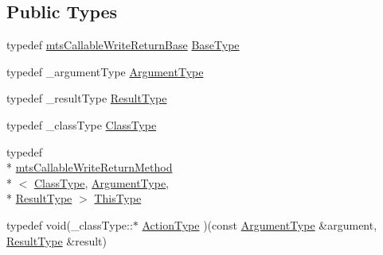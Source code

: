 \subsection*{Public Types}
\begin{DoxyCompactItemize}
\item 
typedef \hyperlink{classmts_callable_write_return_base}{mts\-Callable\-Write\-Return\-Base} \hyperlink{classmts_callable_write_return_method_a324edde317d1c130c8f88c2f3ff71ed2}{Base\-Type}
\item 
typedef \-\_\-argument\-Type \hyperlink{classmts_callable_write_return_method_a694e2620eacec8300718daa334cccd01}{Argument\-Type}
\item 
typedef \-\_\-result\-Type \hyperlink{classmts_callable_write_return_method_aad7815169b189d2f7a0e240ea134fd97}{Result\-Type}
\item 
typedef \-\_\-class\-Type \hyperlink{classmts_callable_write_return_method_a51dbe6298941ab172d83182c8188092d}{Class\-Type}
\item 
typedef \\*
\hyperlink{classmts_callable_write_return_method}{mts\-Callable\-Write\-Return\-Method}\\*
$<$ \hyperlink{classmts_callable_write_return_method_a51dbe6298941ab172d83182c8188092d}{Class\-Type}, \hyperlink{classmts_callable_write_return_method_a694e2620eacec8300718daa334cccd01}{Argument\-Type}, \\*
\hyperlink{classmts_callable_write_return_method_aad7815169b189d2f7a0e240ea134fd97}{Result\-Type} $>$ \hyperlink{classmts_callable_write_return_method_adc8a7a7a10c5aa9fe1e63b4e667c5d6c}{This\-Type}
\item 
typedef void(\-\_\-class\-Type\-::$\ast$ \hyperlink{classmts_callable_write_return_method_a0b5f9726e52abdb0790ccd8c217591b2}{Action\-Type} )(const \hyperlink{classmts_callable_write_return_method_a694e2620eacec8300718daa334cccd01}{Argument\-Type} \&argument, \hyperlink{classmts_callable_write_return_method_aad7815169b189d2f7a0e240ea134fd97}{Result\-Type} \&result)
\end{DoxyCompactItemize}
